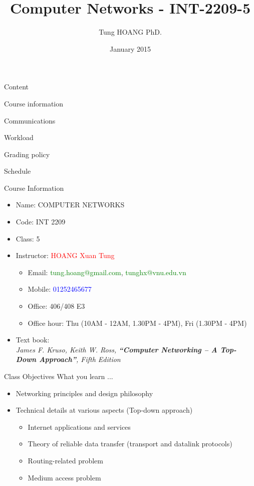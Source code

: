 \documentclass[16pt]{beamer}
\title{Computer Networks - INT-2209-5}
\author{Tung HOANG PhD.}
\institute{University of Engineering and Technology}
\date[2015]{January 2015}
\begin{document}
\frame{\maketitle}

\begin{frame}{Content}
\begin{itemize} \Large{
\item Course information
\item Communications
\item Workload
\item Grading policy
\item Schedule
}
\end{itemize}
\end{frame}

\begin{frame}{Course Information}
\begin{itemize}
    \item Name: COMPUTER NETWORKS
    \item Code: INT 2209
    \item Class: 5
    \item Instructor: \textcolor{red}{HOANG Xuan Tung}
        \begin{itemize}
            \item Email: \textcolor{green}{tung.hoang@gmail.com}, \textcolor{green}{tunghx@vnu.edu.vn}
            \item Mobile: \textcolor{blue}{01252465677}
            \item Office: 406/408 E3
            \item Office hour: Thu (10AM - 12AM, 1.30PM - 4PM), Fri (1.30PM - 4PM)
        \end{itemize}
    \item Text book:\\
\textrm{\emph{James F. Kruso, Keith W. Ross, \textbf{``Computer Networking – A Top-Down Approach''}, Fifth Edition}}
\end{itemize}
\end{frame}

\begin{frame}{Class Objectives}
What you learn ...
\begin{itemize}
    \item Networking principles and design philosophy
    \item Technical details at various aspects (Top-down approach)
        \begin{itemize}
            \item Internet applications and services
            \item Theory of reliable data transfer (transport and datalink protocols)
            \item Routing-related problem
            \item Medium access problem
        \end{itemize}
\end{itemize}
\end{frame}
\end{document}
